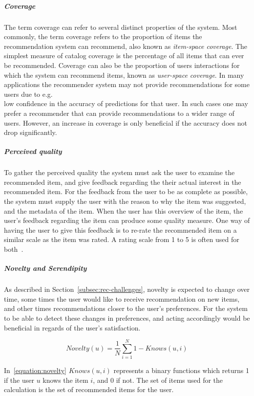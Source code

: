 \subparagraph{Coverage}
The term coverage can refer to several distinct properties of the system. Most
commonly, the term coverage refers to the proportion of items the
recommendation system can recommend, also known as \emph{item-space coverage}.
The simplest measure of catalog coverage is the percentage of all items that
can ever be recommended. Coverage can also be the proportion of users
interactions for which the system can recommend items, known as
\emph{user-space coverage}. In many applications the recommender system may not
provide recommendations for some users due to e.g.\\ low confidence in the
accuracy of predictions for that user. In such cases one may prefer a
recommender that can provide recommendations to a wider range of users. However, an increase in coverage is only beneficial if the accuracy does not drop significantly.

\subparagraph{Perceived quality}
To gather the perceived quality the system must ask the user to examine the recommended item, and give feedback regarding the their actual interest in the recommended item.
For the feedback from the user to be as complete as possible, the system must supply the user with the reason to why the item was suggested, and the metadata of the item.
When the user has this overview of the item, the user's feedback regarding the item can produce some quality measure.
One  way of having the user to give this feedback is to re-rate the recommended item on a similar scale as the item was rated.
A rating scale from 1 to 5 is often used for both~\cite{Schafer:1999:RSE:336992.337035}.

\subparagraph{Novelty and Serendipity}
As described in Section~\ref{subsec:rec-challenges},  novelty is expected to
change over time, some times the user would like to receive recommendation on
new items, and other times recommendations closer to the user's preferences.
For the system to be able to detect these changes in preferences, and acting
accordingly would be beneficial in regards of the user's satisfaction.

\begin{equation}
    Novelty(u) = \frac{1}{N}\sum_{i=1}^{N}{1 - Knows(u,i)}
    \label{equation:novelty}
\end{equation}

In~\ref{equation:novelty} $Knows(u,i)$ represents a binary functions which
returns 1 if the user $u$ knows the item $i$, and 0 if not.  The set of items
used for the calculation is the set of recommended items for the user.


